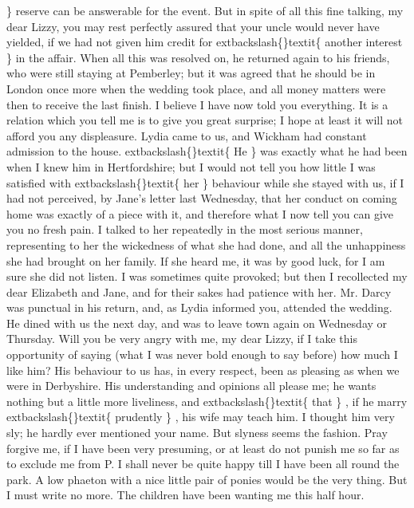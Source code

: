 \documentclass[10pt]{book}
\begin{document}
    \}
    reserve can be answerable for the event. But in spite of all this
fine talking, my dear Lizzy, you may rest perfectly assured that
your uncle would never have yielded, if we had not given him credit
for
    	extbackslash\{\}textit\{
     another interest
    \}
    in the affair. When all this was resolved
on, he returned again to his friends, who were still staying at
Pemberley; but it was agreed that he should be in London once more
when the wedding took place, and all money matters were then to
receive the last finish. I believe I have now told you everything.
It is a relation which you tell me is to give you great surprise; I
hope at least it will not afford you any displeasure. Lydia came to
us, and Wickham had constant admission to the house.
    	extbackslash\{\}textit\{
     He
    \}
    was
exactly what he had been when I knew him in Hertfordshire; but I
would not tell you how little I was satisfied with
    	extbackslash\{\}textit\{
     her
    \}
    behaviour
while she stayed with us, if I had not perceived, by Jane’s letter
last Wednesday, that her conduct on coming home was exactly of a
piece with it, and therefore what I now tell you can give you no
fresh pain. I talked to her repeatedly in the most serious manner,
representing to her the wickedness of what she had done, and all
the unhappiness she had brought on her family. If she heard me, it
was by good luck, for I am sure she did not listen. I was sometimes
quite provoked; but then I recollected my dear Elizabeth and Jane,
and for their sakes had patience with her. Mr. Darcy was punctual
in his return, and, as Lydia informed you, attended the wedding. He
dined with us the next day, and was to leave town again on
Wednesday or Thursday. Will you be very angry with me, my dear
    Lizzy, if I take this opportunity of saying (what I was never bold
enough to say before) how much I like him? His behaviour to us has,
in every respect, been as pleasing as when we were in Derbyshire.
His understanding and opinions all please me; he wants nothing but
a little more liveliness, and
    	extbackslash\{\}textit\{
     that
    \}
    , if he marry
    	extbackslash\{\}textit\{
     prudently
    \}
    , his
wife may teach him. I thought him very sly; he hardly ever
mentioned your name. But slyness seems the fashion. Pray forgive
me, if I have been very presuming, or at least do not punish me so
far as to exclude me from P. I shall never be quite happy till I
have been all round the park. A low phaeton with a nice little pair
of ponies would be the very thing. But I must write no more. The
children have been wanting me this half hour.
   
\end{document}
